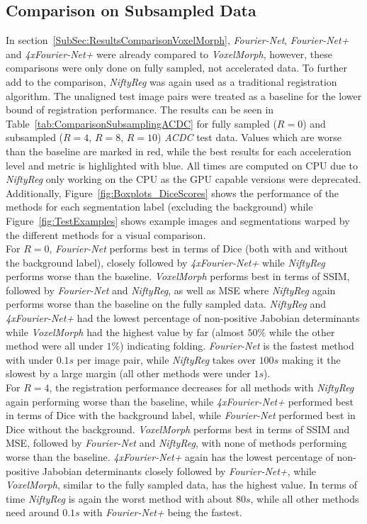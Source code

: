 \documentclass[english,version-2022-01]{uzl-thesis} %
\begin{document}
\subsection{Comparison on Subsampled Data} \label{SubSec:ResultsComparisonSubsampling}
In section~\ref{SubSec:ResultsComparisonVoxelMorph}, \emph{Fourier-Net}, \emph{Fourier-Net+} and \emph{4xFourier-Net+} were already compared to \emph{VoxelMorph}, however, these comparisons were only done on fully sampled, not accelerated data. To further add to the comparison, \emph{NiftyReg} was again used as a traditional registration algorithm. The unaligned test image pairs were treated as a baseline for the lower bound of registration performance. The results can be seen in Table~\ref{tab:ComparisonSubsamplingACDC} for fully sampled ($R=0$) and subsampled ($R=4$, $R=8$, $R=10$) \emph{ACDC} test data. Values which are worse than the baseline are marked in red, while the best results for each acceleration level and metric is highlighted with blue. All times are computed on CPU due to \emph{NiftyReg} only working on the CPU as the GPU capable versions were deprecated. Additionally, Figure~\ref{fig:Boxplots_DiceScores} shows the performance of the methods for each segmentation label (excluding the background) while Figure~\ref{fig:TestExamples} shows example images and segmentations warped by the different methods for a visual comparison.\\
For $R=0$, \emph{Fourier-Net} performs best in terms of Dice (both with and without the background label), closely followed by \emph{4xFourier-Net+} while \emph{NiftyReg} performs worse than the baseline. \emph{VoxelMorph} performs best in terms of SSIM, followed by \emph{Fourier-Net} and \emph{NiftyReg}, as well as MSE where \emph{NiftyReg} again performs worse than the baseline on the fully sampled data. \emph{NiftyReg} and \emph{4xFourier-Net+} had the lowest percentage of non-positive Jabobian determinants while \emph{VoxelMorph} had the highest value by far (almost $50\%$ while the other method were all under $1\%$) indicating folding. \emph{Fourier-Net} is the fastest method with under $0.1s$ per image pair, while \emph{NiftyReg} takes over $100s$ making it the slowest by a large margin (all other methods were under $1s$).\\
For $R=4$, the registration performance decreases for all methods with \emph{NiftyReg} again performing worse than the baseline, while \emph{4xFourier-Net+} performed best in terms of Dice with the background label, while \emph{Fourier-Net} performed best in Dice without the background. \emph{VoxelMorph} performs best in terms of SSIM and MSE, followed by \emph{Fourier-Net} and \emph{NiftyReg}, with none of methods performing worse than the baseline. \emph{4xFourier-Net+} again has the lowest percentage of non-positive Jabobian determinants closely followed by \emph{Fourier-Net+}, while \emph{VoxelMorph}, similar to the fully sampled data, has the highest value. In terms of time \emph{NiftyReg} is again the worst method with about $80s$, while all other methods need around $0.1s$ with \emph{Fourier-Net+} being the fastest.\\
\end{document}
